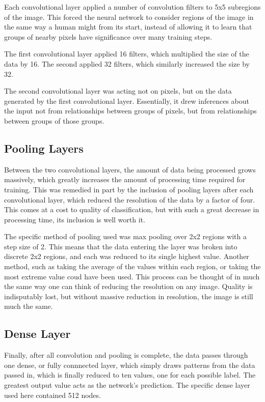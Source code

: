 \documentclass{article}
\begin{document}
Each convolutional layer applied a number of convolution filters to 5x5 subregions of the image. This forced the neural network to consider regions of the image in the same way a human might from its start, instead of allowing it to learn that groups of nearby pixels have significance over many training steps.

The first convolutional layer applied 16 filters, which multiplied the size of the data by 16. The second applied 32 filters, which similarly increased the size by 32.

The second convolutional layer was acting not on pixels, but on the data generated by the first convolutional layer. Essentially, it drew inferences about the input not from relationships between groups of pixels, but from relationships between groups of those groups.

\subsection{Pooling Layers}

Between the two convolutional layers, the amount of data being processed grows massively, which greatly increases the amount of processing time required for training. This was remedied in part by the inclusion of pooling layers after each convolutional layer, which reduced the resolution of the data by a factor of four. This comes at a cost to quality of classification, but with such a great decrease in processing time, its inclusion is well worth it.

The specific method of pooling used was max pooling over 2x2 regions with a step size of 2. This means that the data entering the layer was broken into discrete 2x2 regions, and each was reduced to its single highest value. Another method, such as taking the average of the values within each region, or taking the most extreme value coud have been used. This process can be thought of in much the same way one can think of reducing the resolution on any image. Quality is indisputably lost, but without massive reduction in resolution, the image is still much the same.

\subsection{Dense Layer}

Finally, after all convolution and pooling is complete, the data passes through one dense, or fully connnected layer, which simply draws patterns from the data passed in, which is finally reduced to ten values, one for each possible label. The greatest output value acts as the network's prediction. The specific dense layer used here contained 512 nodes.
\end{document}

